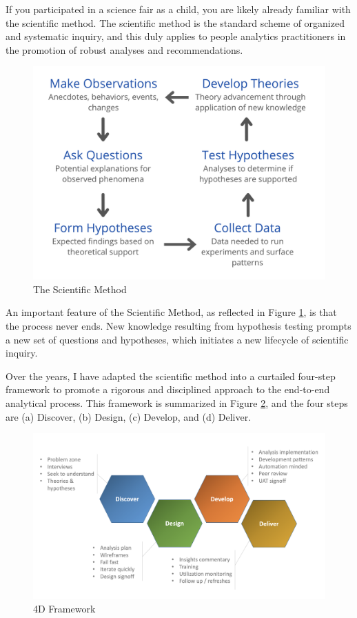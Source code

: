 \documentclass[
]{book}
\begin{document}
If you participated in a science fair as a child, you are likely already familiar with the scientific method. The scientific method is the standard scheme of organized and systematic inquiry, and this duly applies to people analytics practitioners in the promotion of robust analyses and recommendations.

\begin{figure}

{\centering \includegraphics[width=0.75\linewidth]{graphics/scientific_method} 

}

\caption{The Scientific Method}\label{fig:sci-method}
\end{figure}

An important feature of the Scientific Method, as reflected in Figure \ref{fig:sci-method}, is that the process never ends. New knowledge resulting from hypothesis testing prompts a new set of questions and hypotheses, which initiates a new lifecycle of scientific inquiry.

Over the years, I have adapted the scientific method into a curtailed four-step framework to promote a rigorous and disciplined approach to the end-to-end analytical process. This framework is summarized in Figure \ref{fig:4d-framework}, and the four steps are (a) Discover, (b) Design, (c) Develop, and (d) Deliver.

\begin{figure}

{\centering \includegraphics[width=1\linewidth]{graphics/4d_framework_overview} 

}

\caption{4D Framework}\label{fig:4d-framework}
\end{figure}
\end{document}
